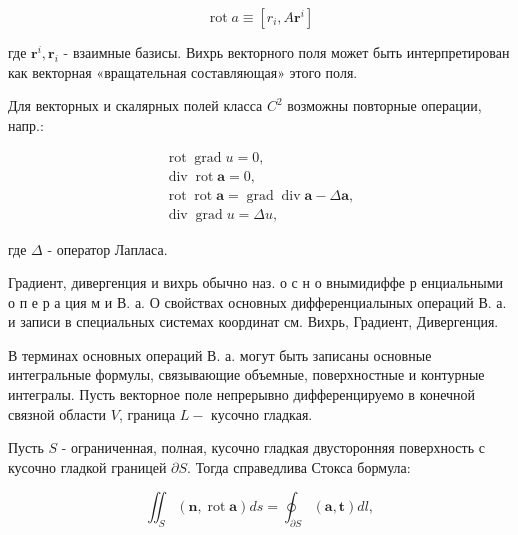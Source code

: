 \documentclass[10pt]{article}
\begin{document}
\[

\operatorname{rot} a \equiv\left[r_{i}, A \boldsymbol{r}^{i}\right]

\]



где $\boldsymbol{r}^{i}, \boldsymbol{r}_{i}$ - взаимные базисы. Вихрь векторного поля может быть интерпретирован как векторная «вращательная составляющая» этого поля.



Для векторных и скалярных полей класса $C^{2}$ возможны повторные операции, напр.:



\[

\begin{gathered}

\operatorname{rot} \operatorname{grad} u=0, \\

\operatorname{div} \operatorname{rot} \boldsymbol{a}=0, \\

\operatorname{rot} \operatorname{rot} \boldsymbol{a}=\operatorname{grad} \operatorname{div} \boldsymbol{a}-\Delta \boldsymbol{a}, \\

\operatorname{div} \operatorname{grad} u=\Delta u,

\end{gathered}

\]



где $\Delta$ - оператор Лапласа.



Градиент, дивергенция и вихрь обычно наз. о с н о внымидиффе р енциальными о п е р а ция м и В. а. О свойствах основных дифференциалыных операций В. а. и записи в специальных системах координат см. Вихрь, Градиент, Дивергенция.



В терминах основных операций В. а. могут быть записаны основные интегральные формулы, связывающие объемные, поверхностные и контурные интегралы. Пусть векторное поле непрерывно дифференцируемо в конечной связной области $V$, граница $L-$ кусочно гладкая.



Пусть $S$ - ограниченная, полная, кусочно гладкая двусторонняя поверхность с кусочно гладкой границей $\partial S$. Тогда справедлива Стокса бормула:



\[

\iint_{S}(\boldsymbol{n}, \operatorname{rot} \boldsymbol{a}) d s=\oint_{\partial S}(\boldsymbol{a}, \boldsymbol{t}) d l,

\]
\end{document}
